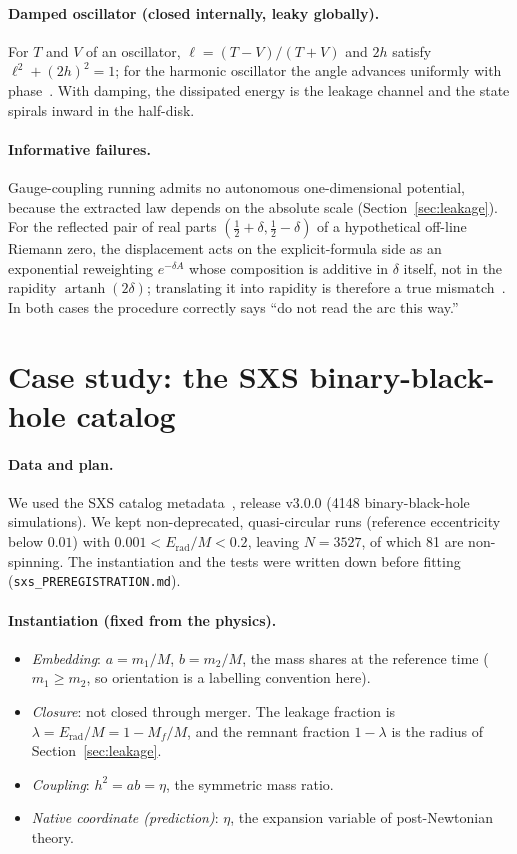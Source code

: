 \documentclass[11pt]{article}
\theoremstyle{definition}
\theoremstyle{remark}
\newcommand{\artanh}{\operatorname{artanh}}
\newcommand{\Erad}{E_{\mathrm{rad}}}
\begin{document}
\paragraph{Damped oscillator (closed internally, leaky globally).} For $T$ and $V$ of an
oscillator, $\ell=(T-V)/(T+V)$ and $2h$ satisfy $\ell^2+(2h)^2=1$; for the harmonic
oscillator the angle advances uniformly with phase~\cite{DeJesus2026HL}. With damping, the
dissipated energy is the leakage channel and the state spirals inward in the half-disk.

\paragraph{Informative failures.} Gauge-coupling running admits no autonomous
one-dimensional potential, because the extracted law depends on the absolute scale
(Section~\ref{sec:leakage}). For the reflected pair of real parts $(\tfrac12+\delta,\tfrac12-\delta)$
of a hypothetical off-line Riemann zero, the displacement acts on the explicit-formula side as
an exponential reweighting $e^{-\delta A}$ whose composition is additive in $\delta$ itself,
not in the rapidity $\artanh(2\delta)$; translating it into rapidity is therefore a true
mismatch~\cite{DeJesusWeil2026}. In both cases the procedure correctly says ``do not read the
arc this way.'' 

\section{Case study: the SXS binary-black-hole catalog}\label{sec:sxs}

\paragraph{Data and plan.} We used the SXS catalog metadata~\cite{Boyle2019,Scheel2025},
release v3.0.0 (4148 binary-black-hole simulations). We kept non-deprecated, quasi-circular
runs (reference eccentricity below $0.01$) with $0.001<\Erad/M<0.2$, leaving $N=3527$, of which
81 are non-spinning. The instantiation and the tests were written down before fitting
(\texttt{sxs\_PREREGISTRATION.md}).

\paragraph{Instantiation (fixed from the physics).}
\begin{itemize}
\item \emph{Embedding}: $a=m_1/M$, $b=m_2/M$, the mass shares at the reference time
($m_1\ge m_2$, so orientation is a labelling convention here).
\item \emph{Closure}: not closed through merger. The leakage fraction is
$\lambda=\Erad/M=1-M_f/M$, and the remnant fraction $1-\lambda$ is the radius of
Section~\ref{sec:leakage}.
\item \emph{Coupling}: $h^2=ab=\eta$, the symmetric mass ratio.
\item \emph{Native coordinate (prediction)}: $\eta$, the expansion variable of post-Newtonian
theory.
\end{itemize}
\end{document}
